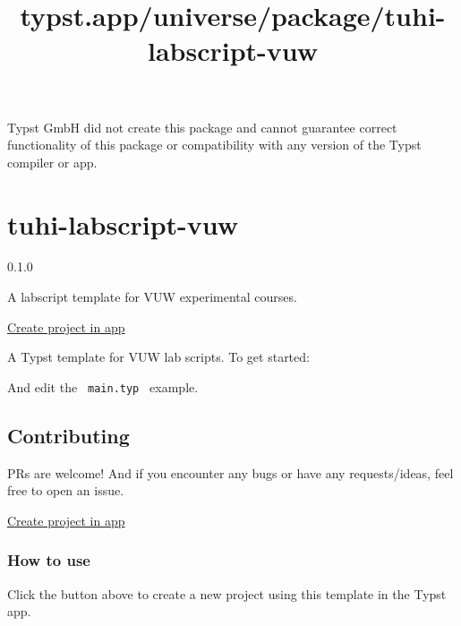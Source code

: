 Typst GmbH did not create this package and cannot guarantee correct
functionality of this package or compatibility with any version of the
Typst compiler or app.


\title{typst.app/universe/package/tuhi-labscript-vuw}

\label{banner}
\label{template-thumbnail}

\section{tuhi-labscript-vuw}\label{tuhi-labscript-vuw}

{ 0.1.0 }

A labscript template for VUW experimental courses.

\href{/app?template=tuhi-labscript-vuw&version=0.1.0}{Create project in
app}

\label{readme}
A Typst template for VUW lab scripts. To get started:

\begin{Shaded}
\begin{Highlighting}[]
\end{Highlighting}
\end{Shaded}

And edit the \texttt{\ main.typ\ } example.


\subsection{Contributing}\label{contributing}

PRs are welcome! And if you encounter any bugs or have any
requests/ideas, feel free to open an issue.

\href{/app?template=tuhi-labscript-vuw&version=0.1.0}{Create project in
app}

\subsubsection{How to use}\label{how-to-use}

Click the button above to create a new project using this template in
the Typst app.

